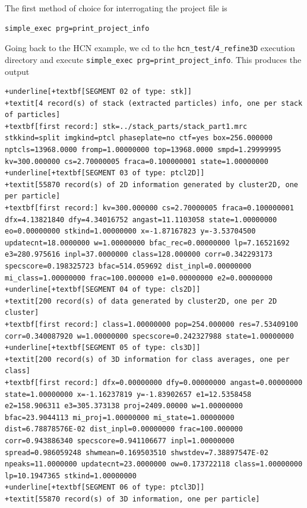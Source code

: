 \documentclass[a4paper,11pt]{article}
\begin{document}
\noindent{}The first method of choice for interrogating the project file is

\begin{Verbatim}[commandchars=+\[\],fontsize=\small,breaklines=true]
simple_exec prg=print_project_info
\end{Verbatim}

\noindent{}Going back to the HCN example, we cd to the \texttt{hcn\_test/4\_refine3D} execution directory and execute \texttt{simple\_exec prg=print\_project\_info}. This produces the output
\begin{Verbatim}[commandchars=+\[\],fontsize=\small,breaklines=true]
+underline[+textbf[SEGMENT 02 of type: stk]]
+textit[4 record(s) of stack (extracted particles) info, one per stack of particles]
+textbf[first record:] stk=../stack_parts/stack_part1.mrc stkkind=split imgkind=ptcl phaseplate=no ctf=yes box=256.000000 nptcls=13968.0000 fromp=1.00000000 top=13968.0000 smpd=1.29999995 kv=300.000000 cs=2.70000005 fraca=0.100000001 state=1.00000000
+underline[+textbf[SEGMENT 03 of type: ptcl2D]]
+textit[55870 record(s) of 2D information generated by cluster2D, one per particle]
+textbf[first record:] kv=300.000000 cs=2.70000005 fraca=0.100000001 dfx=4.13821840 dfy=4.34016752 angast=11.1103058 state=1.00000000 eo=0.00000000 stkind=1.00000000 x=-1.87167823 y=-3.53704500 updatecnt=18.0000000 w=1.00000000 bfac_rec=0.00000000 lp=7.16521692 e3=280.975616 inpl=37.0000000 class=128.000000 corr=0.342293173 specscore=0.198325723 bfac=514.059692 dist_inpl=0.00000000 mi_class=1.00000000 frac=100.000000 e1=0.00000000 e2=0.00000000
+underline[+textbf[SEGMENT 04 of type: cls2D]]
+textit[200 record(s) of data generated by cluster2D, one per 2D cluster]
+textbf[first record:] class=1.00000000 pop=254.000000 res=7.53409100 corr=0.340087920 w=1.00000000 specscore=0.242327988 state=1.00000000
+underline[+textbf[SEGMENT 05 of type: cls3D]]
+textit[200 record(s) of 3D information for class averages, one per class]
+textbf[first record:] dfx=0.00000000 dfy=0.00000000 angast=0.00000000 state=1.00000000 x=-1.16237819 y=-1.83902657 e1=12.5358458 e2=158.906311 e3=305.373138 proj=2409.00000 w=1.00000000 bfac=23.9044113 mi_proj=1.00000000 mi_state=1.00000000 dist=6.78878576E-02 dist_inpl=0.00000000 frac=100.000000 corr=0.943886340 specscore=0.941106677 inpl=1.00000000 spread=0.986059248 shwmean=0.169503510 shwstdev=7.38897547E-02 npeaks=11.0000000 updatecnt=23.0000000 ow=0.173722118 class=1.00000000 lp=10.1947365 stkind=1.00000000
+underline[+textbf[SEGMENT 06 of type: ptcl3D]]
+textit[55870 record(s) of 3D information, one per particle]

\end{Verbatim}
\end{document}
